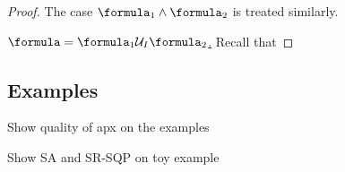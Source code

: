 \begin{proof}
The case $\formula_1 \land \formula_2$ is treated similarly.

\underline{$\formula = \formula_1 \until_I \formula_2$.} 
Recall that 

	\end{proof}
	
\subsection{Examples}

Show quality of apx on the examples

Show SA and SR-SQP on toy example